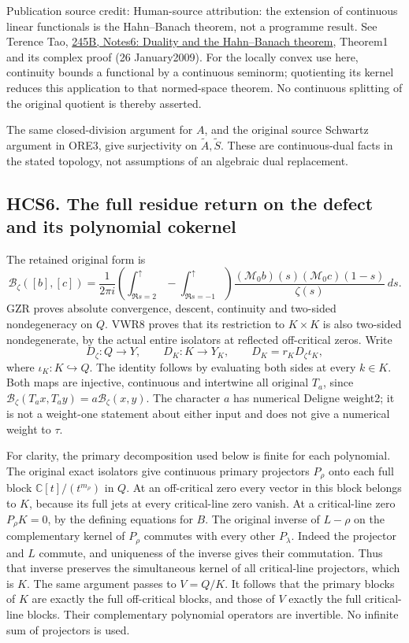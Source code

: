 Publication source credit: Human-source attribution: the extension of
continuous linear functionals is the Hahn--Banach theorem, not a
programme result. See Terence Tao,
\href{https://terrytao.wordpress.com/2009/01/26/245b-notes-6-duality-and-the-hahn-banach-theorem/}{245B,
Notes6: Duality and the Hahn--Banach theorem}, Theorem1 and its complex
proof (26 January2009). For the locally convex use here, continuity
bounds a functional by a continuous seminorm; quotienting its kernel
reduces this application to that normed-space theorem. No continuous
splitting of the original quotient is thereby asserted.

The same closed-division argument for \(A\), and the original source
Schwartz argument in ORE3, give surjectivity on
\(\widetilde A,\widetilde S\). These are continuous-dual facts in the
stated topology, not assumptions of an algebraic dual replacement.

\subsection{HCS6. The full residue return on the defect and its
polynomial
cokernel}\label{hcs6.-the-full-residue-return-on-the-defect-and-its-polynomial-cokernel}

The retained original form is \[
\mathcal B_\zeta([b],[c])=
\frac1{2\pi i}
\left(\int_{\Re s=2}^{\uparrow}
-\int_{\Re s=-1}^{\uparrow}\right)
\frac{(\mathcal M_0b)(s)(\mathcal M_0c)(1-s)}{\zeta(s)}\,ds.
\tag{HCS6.1}
\] GZR proves absolute convergence, descent, continuity and two-sided
nondegeneracy on \(Q\). VWR8 proves that its restriction to
\(K\times K\) is also two-sided nondegenerate, by the actual entire
isolators at reflected off-critical zeros. Write \[
D_\zeta:Q\to Y,\qquad
D_K:K\to Y_K,\qquad
\boxed{D_K=r_KD_\zeta\iota_K,}
\tag{HCS6.2}
\] where \(\iota_K:K\hookrightarrow Q\). The identity follows by
evaluating both sides at every \(k\in K\). Both maps are injective,
continuous and intertwine all original \(T_a\), since
\(\mathcal B_\zeta(T_ax,T_ay)=a\mathcal B_\zeta(x,y)\). The character
\(a\) has numerical Deligne weight2; it is not a weight-one statement
about either input and does not give a numerical weight to \(\tau\).

For clarity, the primary decomposition used below is finite for each
polynomial. The original exact isolators give continuous primary
projectors \(P_\rho\) onto each full block \(\mathbb C[t]/(t^{m_\rho})\)
in \(Q\). At an off-critical zero every vector in this block belongs to
\(K\), because its full jets at every critical-line zero vanish. At a
critical-line zero \(P_\rho K=0\), by the defining equations for \(B\).
The original inverse of \(L-\rho\) on the complementary kernel of
\(P_\rho\) commutes with every other \(P_\lambda\). Indeed the projector
and \(L\) commute, and uniqueness of the inverse gives their
commutation. Thus that inverse preserves the simultaneous kernel of all
critical-line projectors, which is \(K\). The same argument passes to
\(V=Q/K\). It follows that the primary blocks of \(K\) are exactly the
full off-critical blocks, and those of \(V\) exactly the full
critical-line blocks. Their complementary polynomial operators are
invertible. No infinite sum of projectors is used.

